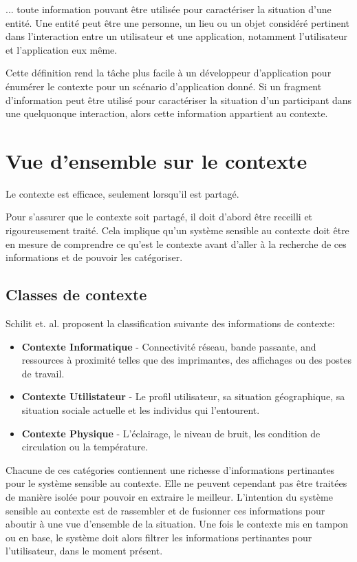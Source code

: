 ... toute information pouvant être utilisée pour caractériser la situation d'une
entité. Une entité peut être une personne, un lieu ou un objet considéré
pertinent dans l'interaction entre un utilisateur et une application, notamment
l'utilisateur et l'application eux même.

Cette définition rend la tâche plus facile à un développeur d'application pour
énumérer le contexte pour un scénario d'application donné. Si un fragment
d'information peut être utilisé pour caractériser la situation d'un participant
dans une quelquonque interaction, alors cette information appartient au
contexte.

\section{Vue d'ensemble sur le contexte}

Le contexte est efficace, seulement lorsqu'il est partagé.

Pour s'assurer que le contexte soit partagé, il doit d'abord être receilli et
rigoureusement traité. Cela implique qu'un système sensible au contexte doit
être en mesure de comprendre ce qu'est le contexte avant d'aller à la recherche
de ces informations et de pouvoir les catégoriser.

\subsection{Classes de contexte}

Schilit et. al. proposent la classification suivante des informations de
contexte:

\begin{itemize}
  \item \textbf{Contexte Informatique} - Connectivité réseau, bande passante,
	  and ressources à proximité telles que des imprimantes, des
	  affichages ou des postes de travail.
  \item \textbf{Contexte Utilistateur} - Le profil utilisateur, sa situation
	  géographique, sa situation sociale actuelle et les individus qui
	  l'entourent.
  \item \textbf{Contexte Physique} - L'éclairage, le niveau de bruit, les
	  condition de circulation ou la température.
\end{itemize}

Chacune de ces catégories contiennent une richesse d'informations pertinantes
pour le système sensible au contexte. Elle ne peuvent cependant pas être
traitées de manière isolée pour pouvoir en extraire le meilleur. L'intention du
système sensible au contexte est de rassembler et de fusionner ces informations
pour aboutir à une vue d'ensemble de la situation. Une fois le contexte mis en
tampon ou en base, le système doit alors filtrer les informations pertinantes
pour l'utilisateur, dans le moment présent.

